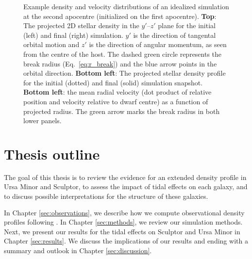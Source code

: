 \begin{figure}
\centering
{}
\caption[Example tidal simulation]{Example density and velocity
distributions of an idealized simulation at the second apocentre
(initialized on the first apocentre). \textbf{Top}: The projected 2D
stellar density in the \(y'\)--\(z'\) plane for the initial (left) and
final (right) simulation. \(y'\) is the direction of tangental orbital
motion and \(z'\) is the direction of angular momentum, as seen from the
centre of the host. The dashed green circle represents the break radius
(Eq.~\ref{eq:r_break}) and the blue arrow points in the orbital
direction. \textbf{Bottom left}: The projected stellar density profile
for the initial (dotted) and final (solid) simulation snapshot.
\textbf{Bottom left}: the mean radial velocity (dot product of relative
position and velocity relative to dwarf centre) as a function of
projected radius. The green arrow marks the break radius in both lower
panels.}\label{fig:idealized_break_radius}
\end{figure}

\section{Thesis outline}\label{thesis-outline}

The goal of this thesis is to review the evidence for an extended
density profile in Ursa Minor and Sculptor, to assess the impact of
tidal effects on each galaxy, and to discuss possible interpretations
for the structure of these galaxies.

In Chapter \ref{sec:observations}, we describe how we compute
observational density profiles following \citet{jensen+2024}. In Chapter
\ref{sec:methods}, we review our simulation methods. Next, we present
our results for the tidal effects on Sculptor and Ursa Minor in Chapter
\ref{sec:results}. We discuss the implications of our results and ending
with a summary and outlook in Chapter \ref{sec:discussion}.
